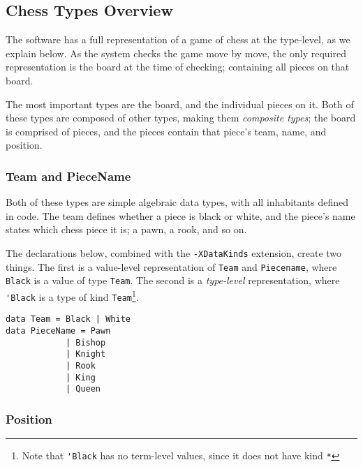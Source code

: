 \documentclass[12pt, a4paper]{scrartcl}
\begin{document}
\subsection{Chess Types Overview}

The software has a full representation of a game of chess at the type-level, as we explain below. As the system checks the game move by move, the only required representation is the board at the time of checking; containing all pieces on that board.

The most important types are the board, and the individual pieces on it. Both of these types are composed of other types, making them \emph{composite types}; the board is comprised of pieces, and the pieces contain that piece's team, name, and position.

\subsubsection{Team and PieceName}

Both of these types are simple algebraic data types, with all inhabitants defined in code. The team defines whether a piece is black or white, and the piece's name states which chess piece it is; a pawn, a rook, and so on.

The declarations below, combined with the \lstinline{-XDataKinds} extension, create two things. The first is a value-level representation of \lstinline{Team} and \lstinline{Piecename}, where \lstinline{Black} is a value of type \lstinline{Team}. The second is a \emph{type-level} representation, where \lstinline{'Black} is a type of kind \lstinline{Team}\footnote{Note that \lstinline{'Black} has no term-level values, since it does not have kind \lstinline{*}}.


\begin{lstlisting}
data Team = Black | White
data PieceName = Pawn
            | Bishop
            | Knight
            | Rook
            | King
            | Queen
\end{lstlisting}

\subsubsection{Position}
\end{document}
